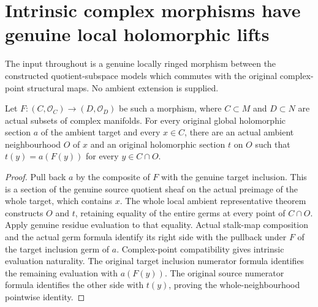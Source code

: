 \section{Intrinsic complex morphisms have genuine local holomorphic lifts}

The input throughout is a genuine locally ringed morphism between the
constructed quotient-subspace models which commutes with the original
complex-point structural maps. No ambient extension is supplied.

\begin{theorem}
\label{hir:actual-analytic-subspace-intrinsic-scalar-lift}
\leanok
Let $F:(C,\mathcal O_C)\to(D,\mathcal O_D)$ be such a morphism, where
$C\subset M$ and $D\subset N$ are actual subsets of complex manifolds.
For every original global holomorphic section $a$ of the ambient target
and every $x\in C$, there are an actual ambient neighbourhood $O$ of $x$
and an original holomorphic section $t$ on $O$ such that
$t(y)=a(F(y))$ for every $y\in C\cap O$.
\end{theorem}
\begin{proof}
Pull back $a$ by the composite of $F$ with the genuine target inclusion.
This is a section of the genuine source quotient sheaf on the actual
preimage of the whole target, which contains $x$. The whole local ambient
representative theorem constructs $O$ and $t$, retaining equality of the
entire germs at every point of $C\cap O$. Apply genuine residue evaluation
to that equality. Actual stalk-map composition and the actual germ formula
identify its right side with the pullback under $F$ of the target inclusion
germ of $a$. Complex-point compatibility gives intrinsic evaluation
naturality. The original target inclusion numerator formula identifies the
remaining evaluation with $a(F(y))$. The original source numerator formula
identifies the other side with $t(y)$, proving the whole-neighbourhood
pointwise identity.
\end{proof}

